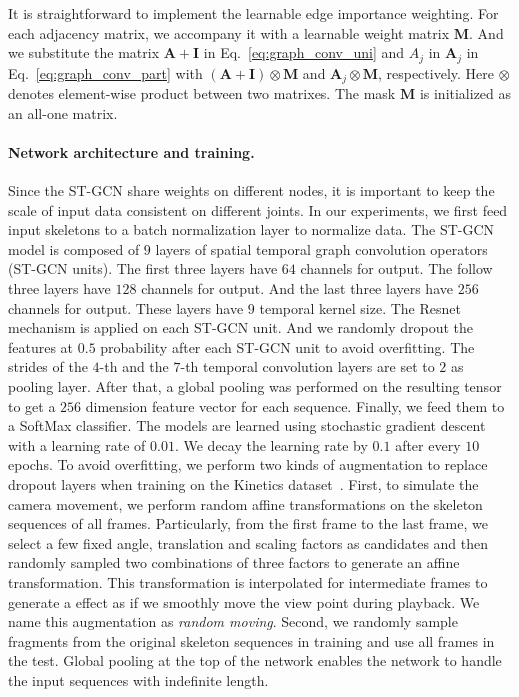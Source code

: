 \documentclass[letterpaper]{article} \usepackage{aaai18}  \usepackage{times}  \usepackage{helvet}  \usepackage{courier}  \usepackage{url}  \usepackage{graphicx}
\begin{document}
It is straightforward to implement the learnable edge importance weighting. 
For each adjacency matrix, we accompany it with a learnable weight matrix $ \mathbf{M} $.
And we substitute the matrix $ \mathbf{A} + \mathbf{I} $ in Eq.~\ref{eq:graph_conv_uni} and $ {A}_j $ in $ \mathbf{A}_j $ in Eq.~\ref{eq:graph_conv_part} with $(\mathbf{A} + \mathbf{I})\otimes\mathbf{M}$ and $ \mathbf{A}_j\otimes \mathbf{M} $, respectively. 
Here $ \otimes $ denotes element-wise product between two matrixes.
The mask $ \mathbf{M} $ is initialized as an all-one matrix. 

\paragraph{Network architecture and training.}
Since the ST-GCN share weights on different nodes, it is important to keep the scale of input data consistent on different joints. 
In our experiments, we first feed input skeletons to a batch normalization layer to normalize data.   
The ST-GCN model is composed of $9$ layers of spatial temporal graph convolution operators (ST-GCN units). 
The first three layers have $ 64 $ channels for output. 
The follow three layers have $128$ channels for output.
And the last three layers have $256$ channels for output.
These layers have $ 9 $ temporal kernel size.
The Resnet mechanism is applied on each ST-GCN unit.
And we randomly dropout the features at $0.5$ probability after each ST-GCN unit to avoid overfitting. 
The strides of the $4$-th and the $7$-th temporal convolution layers are set to $2$ as
pooling layer.
After that, a global pooling was performed on the resulting tensor to get a $ 256 $ dimension feature vector for each sequence. 
Finally, we feed them to a SoftMax classifier.
The models are learned using stochastic gradient descent with a learning rate of $ 0.01 $. We decay the learning rate by $ 0.1 $ after every $ 10 $ epochs.
To avoid overfitting, we perform two kinds of augmentation to replace dropout layers when training on the Kinetics dataset~\cite{Kay2017Kinetics}.
First, to simulate the camera movement, we perform random affine transformations on the skeleton sequences of all frames. 
Particularly, from  the first frame to the last frame, we select a few fixed angle, translation and scaling factors as candidates 
and then randomly
sampled two combinations of three factors to generate an affine transformation. 
This transformation is interpolated for intermediate frames to generate a effect as if we smoothly move the view point during playback.
We name this augmentation as \emph{random moving}.
Second, we randomly sample fragments from the original skeleton sequences in training and use all frames in the test. 
Global pooling at the top of the network enables the network to handle the input sequences with indefinite length.
\end{document}
